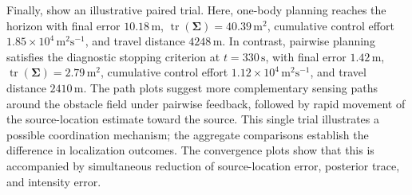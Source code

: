 \documentclass{article}
\DeclareMathOperator{\tr}{tr}
\newcommand{\bs}[1]{\boldsymbol{#1}}
\begin{document}

Finally,  show an illustrative paired trial.
Here, one-body planning reaches the horizon with final error $10.18\,\mathrm{m}$, $\tr(\bs\Sigma)=40.39\, \mathrm{m}^2$, cumulative control effort $1.85\times10^4\,\mathrm{m^2s^{-1}}$, and travel distance $4248\,\mathrm{m}$.
In contrast, pairwise planning satisfies the diagnostic stopping criterion at $t=330\,\mathrm{s}$, with final error $1.42\,\mathrm{m}$, $\tr(\bs\Sigma)=2.79\, \mathrm{m}^2$, cumulative control effort $1.12\times10^4\,\mathrm{m^2s^{-1}}$, and travel distance $2410\,\mathrm{m}$.
The path plots suggest more complementary sensing paths around the obstacle field under pairwise feedback, followed by rapid movement of the source-location estimate toward the source.
This single trial illustrates a possible coordination mechanism; the aggregate comparisons establish the difference in localization outcomes.
The convergence plots show that this is accompanied by simultaneous reduction of source-location error, posterior trace, and intensity error.
\end{document}
